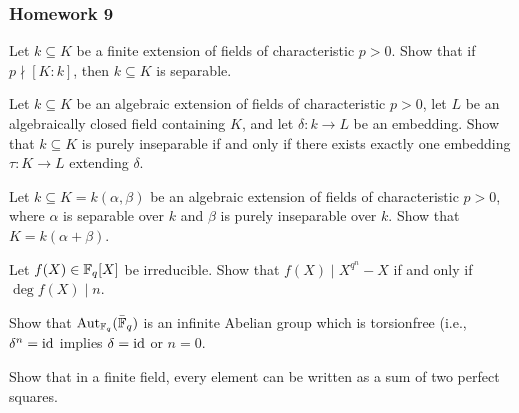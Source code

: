 \subsubsection{Homework 9}
\setcounter{exercise}{0}
\setcounter{equation}{0}

\begin{problem}
  Let \(k\subseteq K\) be a finite extension of fields of characteristic
  \(p>0\). Show that if \(p\nmid[K:k]\), then \(k\subseteq K\) is
  separable.
\end{problem}
\begin{solution}
\end{solution}

\begin{problem}
  Let \(k\subseteq K\) be an algebraic extension of fields of
  characteristic \(p>0\), let \(L\) be an algebraically closed field
  containing \(K\), and let \(\delta\colon k\to L\) be an embedding. Show
  that \(k\subseteq K\) is purely inseparable if and only if there exists
  exactly one embedding \(\tau\colon K\to L\) extending \(\delta\).
\end{problem}
\begin{solution}
\end{solution}

\begin{problem}
  Let \(k\subseteq K=k(\alpha,\beta)\) be an algebraic extension of fields
  of characteristic \(p>0\), where \(\alpha\) is separable over \(k\) and
  \(\beta\) is purely inseparable over \(k\). Show that
  \(K=k(\alpha+\beta)\).
\end{problem}
\begin{solution}
\end{solution}

\begin{problem}
  Let \(f(X)\in\mathbb{F}_q[X]\) be irreducible. Show that \(f(X)\mid X^{q^n}-X\)
  if and only if \(\deg f(X)\mid n\).
\end{problem}
\begin{solution}
\end{solution}

\begin{problem}
  Show that \(\operatorname{Aut}_{\mathbb{F}_q}(\bar{\mathbb{F}}_q)\) is an infinite Abelian group
  which is torsionfree (i.e., \(\delta^n=\operatorname{id}\) implies \(\delta=\operatorname{id}\) or
  \(n=0\).
\end{problem}
\begin{solution}
\end{solution}

\begin{problem}
  Show that in a finite field, every element can be written as a sum of two
  perfect squares.
\end{problem}
\begin{solution}
\end{solution}

